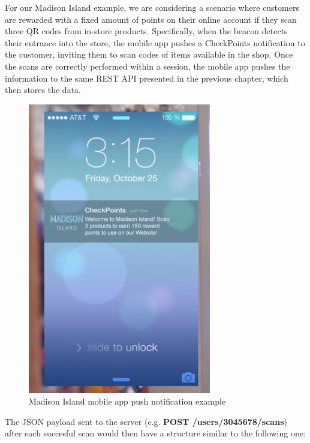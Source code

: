For our Madison Island example, we are considering a scenario where customers are rewarded with a fixed amount of points on their online account if they scan three QR codes from in-store products. Specifically, when the beacon detects their entrance into the store, the mobile app pushes a CheckPoints notification to the customer, inviting them to scan codes of items available in the shop. Once the scans are correctly performed within a session, the mobile app pushes the information to the same REST API presented in the previous chapter, which then stores the data.

\vspace{0.5cm}
\begin{figure}[H]
  \centering
    \includegraphics[width=8cm]{images/madison-push-reward-points.jpg}
  \caption{Madison Island mobile app push notification example}
  \label{fig:mobile-app-push-notification}
\end{figure}
\vspace{0.5cm}


The JSON payload sent to the server (e.g. \textbf{POST /users/3045678/scans}) after each succesful scan would then have a structure similar to the following one:
 
